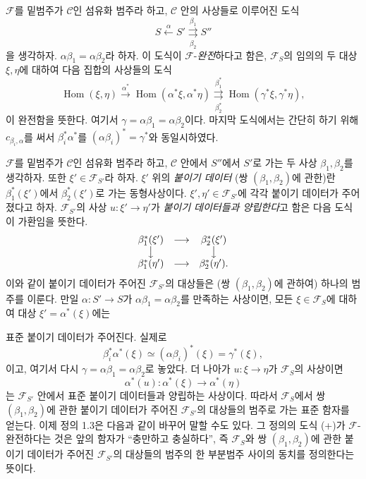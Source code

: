  $\mathcal F$를 밑범주가 $\mathcal C$인 섬유화 범주라
하고, $\mathcal C$ 안의 사상들로 이루어진 도식
\[
  \tag{+}
  S\xleftarrow{\alpha}S'
  \overset{\beta_1}{\underset{\beta_2}{\rightrightarrows}}S''
\]
을 생각하자. $\alpha\beta_1=\alpha\beta_2$라 하자. 이 도식이
$\mathcal F$-\emph{완전}하다고 함은, $\mathcal F_S$의 임의의 두 대상
$\xi,\eta$에 대하여 다음 집합의 사상들의 도식
\[
  \tag{+'}
  \operatorname{Hom}(\xi,\eta)
  \xrightarrow{\alpha^*}
  \operatorname{Hom}(\alpha^*\xi,\alpha^*\eta)
  \overset{\beta_1^*}{\underset{\beta_2^*}{\rightrightarrows}}
  \operatorname{Hom}(\gamma^*\xi,\gamma^*\eta),
\]
이 완전함을 뜻한다. 여기서 $\gamma=\alpha\beta_1=\alpha\beta_2$이다.
마지막 도식에서는 간단히 하기 위해 $c_{\beta_i,\alpha}$를 써서
$\beta_i^*\alpha^*$를 $(\alpha\beta_i)^*=\gamma^*$와 동일시하였다.

 $\mathcal F$를 밑범주가 $\mathcal C$인 섬유화 범주라
하고, $\mathcal C$ 안에서 $S''$에서 $S'$로 가는 두 사상
$\beta_1,\beta_2$를 생각하자. 또한
$\xi'\in\mathcal F_{S'}$라 하자. $\xi'$ 위의 \emph{붙이기 데이터}
(쌍 $(\beta_1,\beta_2)$에 관한)란 $\beta_1^*(\xi')$에서
$\beta_2^*(\xi')$로 가는 동형사상이다. $\xi',\eta'\in\mathcal F_{S'}$에
각각 붙이기 데이터가 주어졌다고 하자. $\mathcal F_{S'}$의 사상
$u:\xi'\longrightarrow\eta'$가 \emph{붙이기 데이터들과 양립한다}고 함은
다음 도식이 가환임을 뜻한다.
\[
\begin{array}{ccc}
  \beta_1^*(\xi') & \longrightarrow & \beta_2^*(\xi') \\
  \big\downarrow && \big\downarrow \\
  \beta_1^*(\eta') & \longrightarrow & \beta_2^*(\eta').
\end{array}
\]
이와 같이 붙이기 데이터가 주어진 $\mathcal F_{S'}$의 대상들은
(쌍 $(\beta_1,\beta_2)$에 관하여) 하나의 범주를 이룬다. 만일
$\alpha:S'\longrightarrow S$가 $\alpha\beta_1=\alpha\beta_2$를 만족하는
사상이면, 모든 $\xi\in\mathcal F_S$에 대하여 대상 $\xi'=\alpha^*(\xi)$에는

표준 붙이기 데이터가 주어진다. 실제로
\[
  \beta_i^*\alpha^*(\xi)\simeq(\alpha\beta_i)^*(\xi)=\gamma^*(\xi),
\]
이고, 여기서 다시 $\gamma=\alpha\beta_1=\alpha\beta_2$로 놓았다. 더 나아가
$u:\xi\longrightarrow\eta$가 $\mathcal F_S$의 사상이면
\[
  \alpha^*(u):\alpha^*(\xi)\longrightarrow\alpha^*(\eta)
\]
는 $\mathcal F_{S'}$ 안에서 표준 붙이기 데이터들과 양립하는
사상이다. 따라서 $\mathcal F_S$에서 쌍 $(\beta_1,\beta_2)$에 관한
붙이기 데이터가 주어진 $\mathcal F_{S'}$의 대상들의 범주로 가는
표준 함자를 얻는다. 이제 정의 1.3은 다음과 같이 바꾸어 말할 수도 있다.
그 정의의 도식 (+)가 $\mathcal F$-완전하다는 것은 앞의 함자가 ``충만하고
충실하다'', 즉 $\mathcal F_S$와 쌍 $(\beta_1,\beta_2)$에 관한 붙이기
데이터가 주어진 $\mathcal F_{S'}$의 대상들의 범주의 한 부분범주 사이의
동치를 정의한다는 뜻이다.

